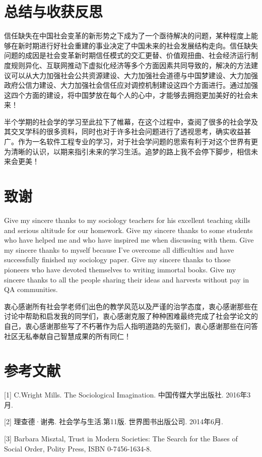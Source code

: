 \documentclass[UTF8]{ctexart}
\begin{document}
    \section{总结与收获反思}
    信任缺失在中国社会变革的新形势之下成为了一个亟待解决的问题，某种程度上能够在新时期进行好社会重建的事业决定了中国未来的社会发展结构走向。信任缺失问题的成因是社会变革新时期信任模式的交汇更替、价值观扭曲、社会经济运行制度规则异化、互联网推动下虚拟化经济等多个方面因素共同导致的，解决的方法建议可以从大力加强社会公共资源建设、大力加强社会道德与中国梦建设、大力加强政府公信力建设、大力加强社会信任应对调控机制建设这四个方面进行。通过加强这四个方面的建设，将中国梦放在每个人的心中，才能够去拥抱更加美好的社会未来！

    半个学期的社会学的学习至此拉下了帷幕，在这个过程中，查阅了很多的社会学及其交叉学科的很多资料，同时也对于许多社会问题进行了透视思考，确实收益甚广。作为一名软件工程专业的学习，对于社会学问题的思索有利于对这个世界有更为清晰的认识，以期来指引未来的学习生活。追梦的路上我不会停下脚步，相信未来会更美！

    \section{致谢}
    Give my sincere thanks to my sociology teachers for his excellent teaching skills and serious altitude for our homework. Give my sincere thanks to some students who have helped me and who have inspired me when discussing with them. Give my sincere thanks to myself because I've overcome all difficulties and have successfully finished my sociology paper. Give my sincere thanks to those pioneers who have devoted themselves to writing immortal books. Give my sincere thanks to all the people sharing their ideas and harvests without pay in QA communities.

    衷心感谢所有社会学老师们出色的教学风范以及严谨的治学态度，衷心感谢那些在讨论中帮助和启发我的同学们，衷心感谢克服了种种困难最终完成了社会学论文的自己，衷心感谢那些写了不朽著作为后人指明道路的先驱们，衷心感谢那些在问答社区无私奉献自己智慧成果的所有同仁！
    
    \section{参考文献}
    [1] C.Wright Mills. The Sociological Imagination. 中国传媒大学出版社. 2016年3月.

    [2] 理查德·谢弗. 社会学与生活.第11版. 世界图书出版公司. 2014年6月.

    [3] Barbara Misztal, Trust in Modern Societies: The Search for the Bases of Social Order, Polity Press, ISBN 0-7456-1634-8.
\end{document}
